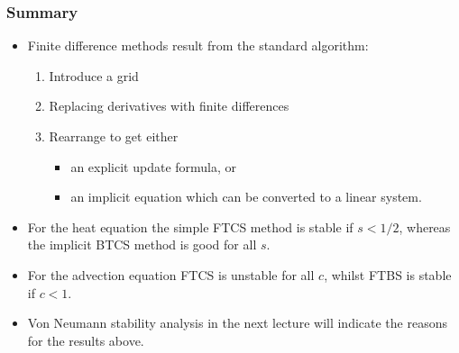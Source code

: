 \documentclass{beamer}
\begin{document}
\begin{frame}
  \frametitle{Summary}

  \begin{itemize}
  \item Finite difference methods result from the standard algorithm:
    \begin{enumerate}
    \item Introduce a grid
    \item Replacing derivatives with finite differences
    \item Rearrange to get either
      \begin{itemize}
      \item an explicit update formula, or
      \item an implicit equation which can be converted to a linear system.
      \end{itemize}
    \end{enumerate}
  \item For the heat equation the simple FTCS method is stable if $s <
    1/2$, whereas the implicit BTCS method is good for all $s$.
  \item For the advection equation FTCS is unstable for all $c$,
    whilst FTBS is stable if $c < 1$.
  \item Von Neumann stability analysis in the next lecture will
    indicate the reasons for the results above.
  \end{itemize}

\end{frame}
\end{document}
